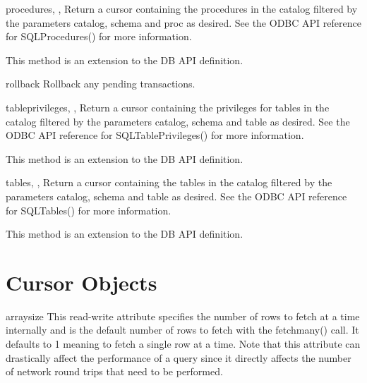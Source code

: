 \documentclass{manual}
\begin{document}
\begin{funcdesc}{procedures}{, ,
    }
  Return a cursor containing the procedures in the catalog filtered by the
  parameters catalog, schema and proc as desired. See the ODBC API reference
  for SQLProcedures() for more information.

   This method is an extension to the DB API definition.
\end{funcdesc}

\begin{funcdesc}{rollback}{}
  Rollback any pending transactions.
\end{funcdesc}

\begin{funcdesc}{tableprivileges}{, ,
    }
  Return a cursor containing the privileges for tables in the catalog filtered
  by the parameters catalog, schema and table as desired. See the ODBC API
  reference for SQLTablePrivileges() for more information.

   This method is an extension to the DB API definition.
\end{funcdesc}

\begin{funcdesc}{tables}{, ,
    }
  Return a cursor containing the tables in the catalog filtered by the
  parameters catalog, schema and table as desired. See the ODBC API reference
  for SQLTables() for more information.

   This method is an extension to the DB API definition.
\end{funcdesc}

\chapter{Cursor Objects\label{cursorobj}}

\begin{datadesc}{arraysize}
  This read-write attribute specifies the number of rows to fetch at a time
  internally and is the default number of rows to fetch with the fetchmany()
  call. It defaults to 1 meaning to fetch a single row at a time. Note that
  this attribute can drastically affect the performance of a query since it
  directly affects the number of network round trips that need to be performed.
\end{datadesc}
\end{document}
